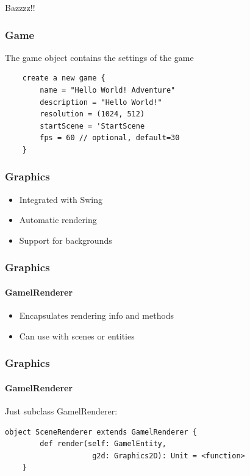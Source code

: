 \documentclass{beamer}
\begin{document}
{\begin{frame}
    \pause

    \begin{center}
    \color{green}
    \huge{Bazzzz!!}
    \end{center}
\end{frame}
}

\begin{frame}[fragile]
    \frametitle{Game}
    The game object contains the settings of the game
    \begin{lstlisting}
    create a new game {
        name = "Hello World! Adventure"
        description = "Hello World!"
        resolution = (1024, 512)
        startScene = 'StartScene
        fps = 60 // optional, default=30
    }
    \end{lstlisting}
\end{frame}

\begin{frame}
    \frametitle{Graphics}
    \begin{itemize}[<+->]
        \item{Integrated with Swing}
        \item{Automatic rendering}
        \item{Support for backgrounds}
    \end{itemize}
\end{frame}

\begin{frame}
    \frametitle{Graphics}
    \framesubtitle{GamelRenderer}
    \begin{itemize}[<+->]
        \item{Encapsulates rendering info and methods}
        \item{Can use with scenes or entities}
    \end{itemize}
\end{frame}

\begin{frame}[fragile]
    \frametitle{Graphics}
    \framesubtitle{GamelRenderer}
    Just subclass GamelRenderer:
    \begin{lstlisting}[basicstyle=\small]
    object SceneRenderer extends GamelRenderer {
        def render(self: GamelEntity,
                    g2d: Graphics2D): Unit = <function>
    }
    \end{lstlisting}
\end{frame}
\end{document}
